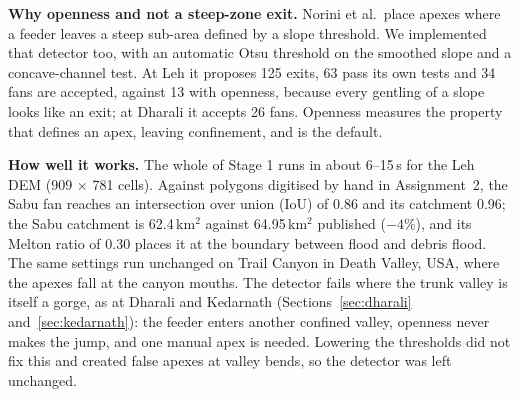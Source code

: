 \documentclass[sigconf,nonacm]{acmart}
\begin{document}
\textbf{Why openness and not a steep-zone exit.} Norini et al.\ place apexes where a feeder leaves a steep sub-area defined by a slope threshold. We implemented that detector too, with an automatic Otsu threshold \cite{otsu1979} on the smoothed slope and a concave-channel test. At Leh it proposes 125 exits, 63 pass its own tests and 34 fans are accepted, against 13 with openness, because every gentling of a slope looks like an exit; at Dharali it accepts 26 fans. Openness measures the property that defines an apex, leaving confinement, and is the default.

\textbf{How well it works.} The whole of Stage 1 runs in about 6--15\,s for the Leh DEM (909 $\times$ 781 cells). Against polygons digitised by hand in Assignment~2, the Sabu fan reaches an intersection over union (IoU) of 0.86 and its catchment 0.96; the Sabu catchment is 62.4\,km$^2$ against 64.95\,km$^2$ published \cite{thayyen2013} ($-4\%$), and its Melton ratio of 0.30 places it at the boundary between flood and debris flood. The same settings run unchanged on Trail Canyon in Death Valley, USA, where the apexes fall at the canyon mouths. The detector fails where the trunk valley is itself a gorge, as at Dharali and Kedarnath (Sections~\ref{sec:dharali} and~\ref{sec:kedarnath}): the feeder enters another confined valley, openness never makes the jump, and one manual apex is needed. Lowering the thresholds did not fix this and created false apexes at valley bends, so the detector was left unchanged.
\end{document}

